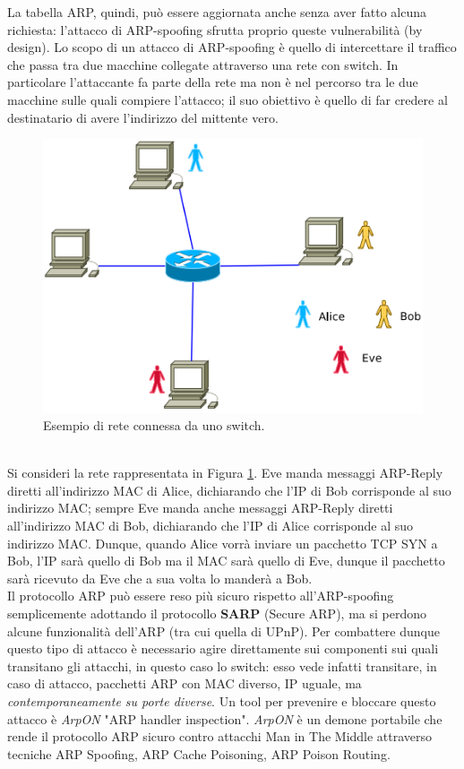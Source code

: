 La tabella ARP, quindi, può essere aggiornata anche senza aver fatto alcuna richiesta: l'attacco di ARP-spoofing sfrutta proprio queste vulnerabilità (by design). Lo scopo di un attacco di ARP-spoofing è quello di intercettare il traffico che passa tra due macchine collegate attraverso una rete con switch. In particolare l'attaccante fa parte della rete ma non è nel percorso tra le due macchine sulle quali compiere l'attacco; il suo obiettivo è quello di far credere al destinatario di avere l'indirizzo del mittente vero.
\begin{figure}[htbp]
	\centering
	\includegraphics[scale = 0.5]{images/ARP-spoofing}
	\caption{Esempio di rete connessa da uno switch.}
	\label{img:ARP-spoofing}
\end{figure}\\
Si consideri la rete rappresentata in Figura \ref{img:ARP-spoofing}. Eve manda messaggi ARP-Reply diretti all'indirizzo MAC di Alice, dichiarando che l'IP di Bob corrisponde al suo indirizzo MAC; sempre Eve manda anche messaggi ARP-Reply diretti all'indirizzo MAC di Bob, dichiarando che l'IP di Alice corrisponde al suo indirizzo MAC. Dunque, quando Alice vorrà inviare un pacchetto TCP SYN a Bob, l'IP sarà quello di Bob ma il MAC sarà quello di Eve, dunque il pacchetto sarà ricevuto da Eve che a sua volta lo manderà a Bob.\\
Il protocollo ARP può essere reso più sicuro rispetto all'ARP-spoofing semplicemente adottando il protocollo \textbf{SARP} (Secure ARP), ma si perdono alcune funzionalità dell'ARP (tra cui quella di UPnP). Per combattere dunque questo tipo di attacco è necessario agire direttamente sui componenti sui quali transitano gli attacchi, in questo caso lo switch: esso vede infatti transitare, in caso di attacco, pacchetti ARP con MAC diverso, IP uguale, ma \textit{contemporaneamente su porte diverse}. Un tool per prevenire e bloccare questo attacco è \textit{ArpON} "ARP handler inspection". \textit{ArpON} è un demone portabile che rende il protocollo ARP sicuro contro attacchi Man in The Middle attraverso tecniche ARP Spoofing, ARP Cache Poisoning, ARP Poison Routing. 

